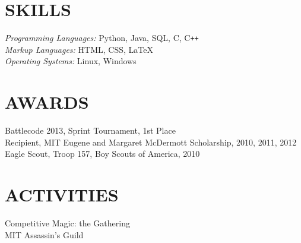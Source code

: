 \documentclass[margin]{res}
\begin{document}
\begin{resume}
\section{SKILLS}    {\sl Programming Languages:} Python, Java, SQL, C,
                      C\texttt{++} \\
                    {\sl Markup Languages:} HTML, CSS, \LaTeX \\
                    {\sl Operating Systems:} Linux, Windows
 
 
\section{AWARDS}    Battlecode 2013, Sprint Tournament, 1st Place\\
                    Recipient, MIT Eugene and Margaret McDermott Scholarship, 
                    2010, 2011, 2012\\
                    Eagle Scout, Troop 157, Boy Scouts of America, 2010

\section{ACTIVITIES}
                    Competitive Magic: the Gathering\\
                    MIT Assassin's Guild \\

\end{resume}
\end{document}
